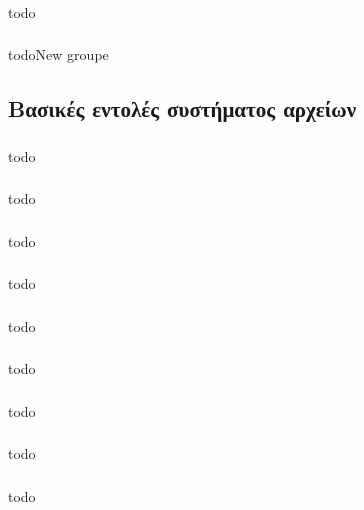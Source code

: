 \documentclass[a4paper, 12pt]{article}
\begin{document}
		\subsubsection{}
			todo

		\subsubsection{}
			todoNew groupe

	\subsection{Βασικές εντολές συστήματος αρχείων}

		\subsubsection{}
			todo

		\subsubsection{}
			todo

		\subsubsection{}
			todo

		\subsubsection{}
			todo

		\subsubsection{}
			todo

		\subsubsection{}
			todo

		\subsubsection{}
			todo

		\subsubsection{}
			todo

		\subsubsection{}
			todo
\end{document}
